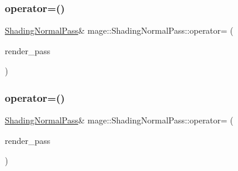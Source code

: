 \hypertarget{classmage_1_1_shading_normal_pass_afef400a6e3b00a43f6b6d3a3f34d43b7}{}\label{classmage_1_1_shading_normal_pass_afef400a6e3b00a43f6b6d3a3f34d43b7} 
\subsubsection{\texorpdfstring{operator=()}{operator=()}\hspace{0.1cm}{\footnotesize\ttfamily [1/2]}}
{\footnotesize\ttfamily \hyperlink{classmage_1_1_shading_normal_pass}{Shading\+Normal\+Pass}\& mage\+::\+Shading\+Normal\+Pass\+::operator= (\begin{DoxyParamCaption}\item[{const \hyperlink{classmage_1_1_shading_normal_pass}{Shading\+Normal\+Pass} \&}]{render\+\_\+pass }\end{DoxyParamCaption})\hspace{0.3cm}{\ttfamily [delete]}}

\hypertarget{classmage_1_1_shading_normal_pass_a25a9ba6a32a246176929f4de1a4adf0c}{}\label{classmage_1_1_shading_normal_pass_a25a9ba6a32a246176929f4de1a4adf0c} 
\subsubsection{\texorpdfstring{operator=()}{operator=()}\hspace{0.1cm}{\footnotesize\ttfamily [2/2]}}
{\footnotesize\ttfamily \hyperlink{classmage_1_1_shading_normal_pass}{Shading\+Normal\+Pass}\& mage\+::\+Shading\+Normal\+Pass\+::operator= (\begin{DoxyParamCaption}\item[{\hyperlink{classmage_1_1_shading_normal_pass}{Shading\+Normal\+Pass} \&\&}]{render\+\_\+pass }\end{DoxyParamCaption})\hspace{0.3cm}{\ttfamily [delete]}}

\hypertarget{classmage_1_1_shading_normal_pass_ab760947cd91e5b05cdf2bacbad0b60e1}{}\label{classmage_1_1_shading_normal_pass_ab760947cd91e5b05cdf2bacbad0b60e1} 
